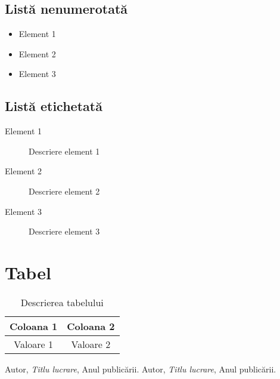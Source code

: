 \documentclass{article}
\begin{document}
\subsection{Listă nenumerotată}
\begin{itemize}
    \item Element 1
    \item Element 2
    \item Element 3
\end{itemize}

\subsection{Listă etichetată}
\begin{description}
    \item[Element 1] Descriere element 1
    \item[Element 2] Descriere element 2
    \item[Element 3] Descriere element 3
\end{description}

\section{Tabel}
\begin{table}[ht]
    \centering
    \begin{tabular}{|c|c|}
        \hline
        Coloana 1 & Coloana 2 \\
        \hline
        Valoare 1 & Valoare 2 \\
        \hline
    \end{tabular}
    \caption{Descrierea tabelului}
    \label{tab:tabel}
\end{table}

\begin{thebibliography}{9}
     Autor, \emph{Titlu lucrare}, Anul publicării.
     Autor, \emph{Titlu lucrare}, Anul publicării.
\end{thebibliography}
\end{document}
